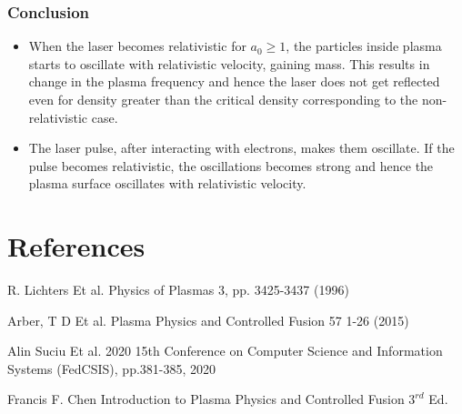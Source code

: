 \documentclass{beamer}
\begin{document}
\begin{frame}
    \frametitle{Conclusion}
    \small
    \begin{itemize}
        \item When the laser becomes relativistic for $a_0 \ge 1$, the particles inside plasma starts to oscillate with relativistic velocity, gaining mass. This results in change in the plasma frequency and hence the laser does not get reflected even for density greater than the critical density corresponding to the non-relativistic case.
        \item The laser pulse, after interacting with electrons, makes them oscillate. If the pulse becomes relativistic, the oscillations becomes strong and hence the plasma surface oscillates with relativistic velocity.
    \end{itemize}    
    \section{References}
    
    \begin{thebibliography}{9}
        R. Lichters Et al. Physics of Plasmas 3, pp. 3425-3437 (1996)
    
        Arber, T D Et al. Plasma Physics and Controlled Fusion 57 1-26 (2015)
    
        Alin Suciu Et al. 2020 15th Conference on Computer Science and Information Systems (FedCSIS), pp.381-385, 2020
    
        Francis F. Chen
        Introduction to Plasma Physics and Controlled Fusion $3^{rd}$ Ed.
    
    \end{thebibliography}
\end{frame}
\end{document}
